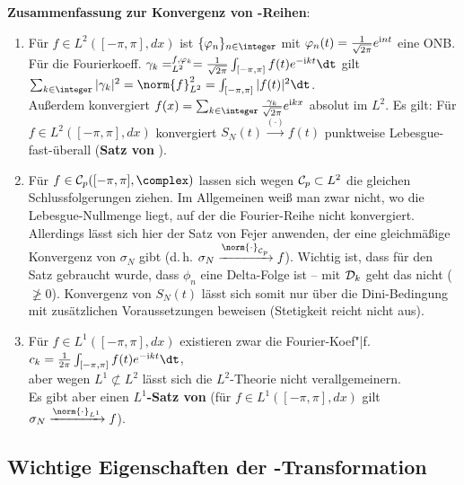 \linie

\textbf{Zusammenfassung zur Konvergenz von -Reihen}:
\begin{enumerate}
    \item
    Für $f \in L^2([-\pi, \pi], dx)$ ist $\{\varphi_n\}_{n \in \integer}$
    mit $\varphi_n(t) = \frac{1}{\sqrt{2\pi}} e^{\mathrm{i} nt}$ eine ONB.
    Für die Fourierkoeff. $\gamma_k = \sp{f, \varphi_k}_{L^2} =
    \frac{1}{\sqrt{2\pi}} \int_{[-\pi, \pi]} f(t) e^{-\i kt}\dt$ gilt
    $\sum_{k \in \integer} |\gamma_k|^2 = \norm{f}_{L^2}^2 =
    \int_{[-\pi, \pi]} |f(t)|^2 \dt$.\\
    Außerdem konvergiert $f(x) = \sum_{k \in \integer}
    \frac{\gamma_k}{\sqrt{2\pi}} e^{\i kx}$ absolut im $L^2$.
    Es gilt:
    Für $f \in L^2([-\pi, \pi], dx)$ konvergiert
    $S_N(t) \xrightarrow{(\cdot)} f(t)$ punktweise Lebesgue-fast-überall
    (\textbf{Satz von }).
    
    \item
    Für $f \in \C_p([-\pi, \pi], \complex)$ lassen sich wegen
    $\mathcal{C}_p \subset L^2$ die gleichen Schlussfolgerungen ziehen.
    Im Allgemeinen weiß man zwar nicht, wo die Lebesgue-Nullmenge liegt,
    auf der die Fourier-Reihe nicht konvergiert.
    Allerdings lässt sich hier der Satz von Fejer anwenden, der eine
    gleichmäßige Konvergenz von $\sigma_N$ gibt
    (d.\,h. $\sigma_N \xrightarrow{\norm{\cdot}_{\C_p}} f$).
    Wichtig ist, dass für den Satz gebraucht wurde, dass $\phi_n$ eine
    Delta-Folge ist -- mit $\mathcal{D}_k$ geht das nicht ($\not\ge 0$).
    Konvergenz von $S_N(t)$ lässt sich somit nur über die Dini-Bedingung mit
    zusätzlichen Voraussetzungen beweisen (Stetigkeit reicht nicht aus).
    
    \item
    Für $f \in L^1([-\pi, \pi], dx)$ existieren zwar die
    Fourier-Koef"|f.
    $c_k = \frac{1}{2\pi} \int_{[-\pi, \pi]} f(t) e^{-\i kt} \dt$,\\
    aber wegen $L^1 \not\subset L^2$ lässt sich die $L^2$-Theorie nicht
    verallgemeinern.\\
    Es gibt aber einen \textbf{$L^1$-Satz von }
    (für $f \in L^1([-\pi, \pi], dx)$ gilt
    $\sigma_N \xrightarrow{\norm{\cdot}_{L^1}} f$).
\end{enumerate}

\subsection{%
    Wichtige Eigenschaften der -Transformation%
}

